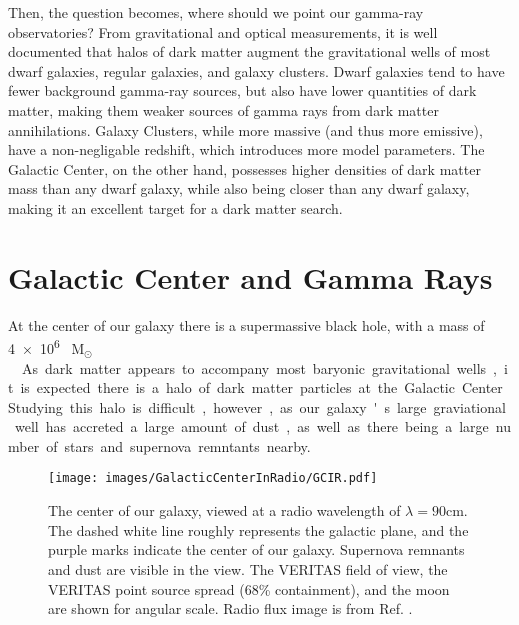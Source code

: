   Then, the question becomes, where should we point our gamma-ray observatories?
  From gravitational and optical measurements, it is well documented that halos of dark matter augment the gravitational wells of most dwarf galaxies, regular galaxies, and galaxy clusters.
  Dwarf galaxies tend to have fewer background gamma-ray sources, but also have lower quantities of dark matter, making them weaker sources of gamma rays from dark matter annihilations.
  Galaxy Clusters, while more massive (and thus more emissive), have a non-negligable redshift, which introduces more model parameters.
  The Galactic Center, on the other hand, possesses higher densities of dark matter mass than any dwarf galaxy, while also being closer than any dwarf galaxy, making it an excellent target for a dark matter search.


\section{Galactic Center and Gamma Rays}

  At the center of our galaxy there is a supermassive black hole, with a mass of \SI{4e6}{ M${{}_\odot}$ }~\cite{sgra_massdist}.
  As dark matter appears to accompany most baryonic gravitational wells, it is expected there is a halo of dark matter particles at the Galactic Center.
  Studying this halo is difficult, however, as our galaxy's large graviational well has accreted a large amount of dust, as well as there being a large number of stars and supernova remntants nearby.

  \begin{figure}[!t]
    \centering
    \texttt{[image: images/GalacticCenterInRadio/GCIR.pdf]}
    \caption[Galactic Center in Radio]{
      The center of our galaxy, viewed at a radio wavelength of $\lambda=90\text{cm}$.
      The dashed white line roughly represents the galactic plane, and the purple marks indicate the center of our galaxy.
      Supernova remnants and dust are visible in the view.
      The VERITAS field of view, the VERITAS point source spread (68\% containment), and the moon are shown for angular scale.
      Radio flux image is from Ref. \cite{galactic_center_in_radio}.
      \CaptionBlankLine
    }
    \label{fig_gc_radio}
  \end{figure}

